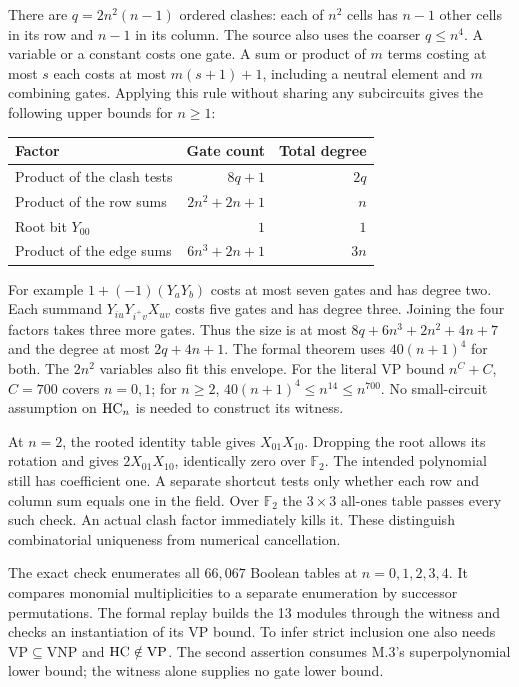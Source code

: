 \newpage
{}
There are $q=2n^2(n-1)$ ordered clashes: each of $n^2$ cells has $n-1$ other cells in its row and $n-1$ in its column. The source also uses the coarser $q\le n^4$. A variable or a constant costs one gate. A sum or product of $m$ terms costing at most $s$ each costs at most $m(s+1)+1$, including a neutral element and $m$ combining gates. Applying this rule without sharing any subcircuits gives the following upper bounds for $n\ge1$:
\begin{center}
\begin{tabular}{lrr}
Factor & Gate count & Total degree\\ \hline
Product of the clash tests & $8q+1$ & $2q$\\
Product of the row sums & $2n^2+2n+1$ & $n$\\
Root bit $Y_{00}$ & $1$ & $1$\\
Product of the edge sums & $6n^3+2n+1$ & $3n$
\end{tabular}
\end{center}
For example $1+(-1)(Y_aY_b)$ costs at most seven gates and has degree two. Each summand $Y_{iu}Y_{i^+v}X_{uv}$ costs five gates and has degree three. Joining the four factors takes three more gates. Thus the size is at most $8q+6n^3+2n^2+4n+7$ and the degree at most $2q+4n+1$. The formal theorem uses $40(n+1)^4$ for both. The $2n^2$ variables also fit this envelope. For the literal VP bound $n^C+C$, $C=700$ covers $n=0,1$; for $n\ge2$, $40(n+1)^4\le n^{14}\le n^{700}$. No small-circuit assumption on $\mathrm{HC}_n$ is needed to construct its witness.

At $n=2$, the rooted identity table gives $X_{01}X_{10}$. Dropping the root allows its rotation and gives $2X_{01}X_{10}$, identically zero over $\mathbb F_2$. The intended polynomial still has coefficient one. A separate shortcut tests only whether each row and column sum equals one in the field. Over $\mathbb F_2$ the $3\times3$ all-ones table passes every such check. An actual clash factor immediately kills it. These distinguish combinatorial uniqueness from numerical cancellation.

The exact check enumerates all $66{,}067$ Boolean tables at $n=0,1,2,3,4$. It compares monomial multiplicities to a separate enumeration by successor permutations. The formal replay builds the 13 modules through the witness and checks an instantiation of its VP bound. To infer strict inclusion one also needs $\mathrm{VP}\subseteq\mathrm{VNP}$ and $\mathrm{HC}\notin\mathrm{VP}$. The second assertion consumes M.3's superpolynomial lower bound; the witness alone supplies no gate lower bound.

